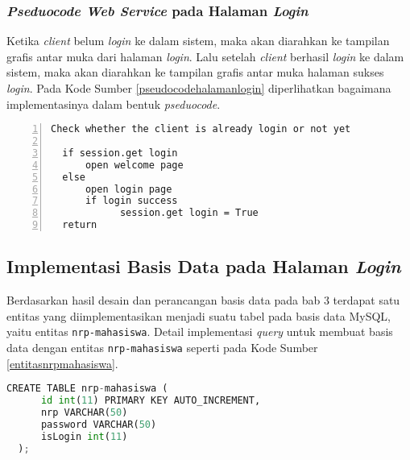   \subsubsection{\textit{Pseduocode Web Service} pada Halaman \textit{Login}}
  Ketika \textit{client} belum \textit{login} ke dalam sistem, maka akan diarahkan ke tampilan grafis antar muka dari halaman \textit{login}. Lalu setelah \textit{client} berhasil \textit{login} ke dalam sistem, maka akan diarahkan ke tampilan grafis antar muka halaman sukses \textit{login}. Pada Kode Sumber \ref{pseudocodehalamanlogin} diperlihatkan bagaimana implementasinya dalam bentuk \textit{pseduocode}.
  
  \begin{minipage}{\linewidth}  
  \begin{lstlisting}[numbers=left, frame=single,tabsize=2,breaklines,caption={Pseudocode Web Service},label=pseudocodehalamanlogin]
  Check whether the client is already login or not yet
  	
  if session.get login
	  open welcome page
  else
	  open login page
	  if login success
			session.get login = True	  
  return  	
  \end{lstlisting}
  \end{minipage}
  
  
  \subsection{Implementasi Basis Data pada Halaman \textit{Login}}
  Berdasarkan hasil desain dan perancangan basis data pada bab 3 terdapat satu entitas yang diimplementasikan menjadi suatu tabel pada basis data MySQL, yaitu entitas \texttt{nrp-mahasiswa}. Detail implementasi \textit{query} untuk membuat basis data dengan entitas \texttt{nrp-mahasiswa} seperti pada Kode Sumber \ref{entitasnrpmahasiswa}.\\
  \begin{minipage}{\linewidth}
  \begin{lstlisting}[language=python, caption=\textit{Query} untuk membuat tabel testing,label=entitasnrpmahasiswa]
  CREATE TABLE nrp-mahasiswa (
	  id int(11) PRIMARY KEY AUTO_INCREMENT,
	  nrp VARCHAR(50)
	  password VARCHAR(50)
	  isLogin int(11)
  );
  \end{lstlisting}
  \end{minipage}
    
